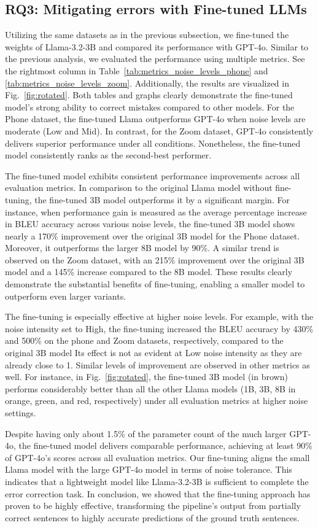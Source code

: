 \subsection{RQ3: Mitigating errors with Fine-tuned LLMs}
\label{sec:ft_results}
Utilizing the same datasets as in the previous subsection, we fine-tuned the weights of Llama-3.2-3B and compared its performance with GPT-4o.
Similar to the previous analysis, we evaluated the performance using multiple metrics. See the rightmost column in Table~\ref{tab:metrics_noise_levels_phone} and \ref{tab:metrics_noise_levels_zoom}. Additionally, the results are visualized in Fig.~\ref{fig:rotated}. 
Both tables and graphs clearly demonstrate the fine-tuned model's strong ability to correct mistakes compared to other models. For the Phone dataset, the fine-tuned Llama outperforms GPT-4o when noise levels are moderate (Low and Mid). In contrast, for the Zoom dataset, GPT-4o consistently delivers superior performance under all conditions. Nonetheless, the fine-tuned model consistently ranks as the second-best performer.
\par
The fine-tuned model exhibits consistent performance improvements across all evaluation metrics. In comparison to the original Llama model without fine-tuning, the fine-tuned 3B model outperforms it by a significant margin. For instance, when performance gain is measured as the average percentage increase in BLEU accuracy across various noise levels, the fine-tuned 3B model shows nearly a 170\% improvement over the original 3B model for the Phone dataset. Moreover, it outperforms the larger 8B model by 90\%. A similar trend is observed on the Zoom dataset, with an 215\% improvement over the original 3B model and a 145\% increase compared to the 8B model. These results clearly demonstrate the substantial benefits of fine-tuning, enabling a smaller model to outperform even larger variants.
\par
The fine-tuning is especially effective at higher noise levels. For example, with the noise intensity set to High, the fine-tuning increased the BLEU accuracy by 430\% and 500\% on the phone and Zoom datasets, respectively, compared to the original 3B model 
Its effect is not as evident at Low noise intensity as they are already close to 1. 
Similar levels of improvement are observed in other metrics as well. 
For instance, in Fig.~\ref{fig:rotated}, the fine-tuned 3B model (in brown) performs considerably better than all the other Llama models (1B, 3B, 8B in orange, green, and red, respectively) under all evaluation metrics at higher noise settings. 
\par
Despite having only about 1.5\% of the parameter count of the much larger GPT-4o, the fine-tuned model delivers comparable performance, achieving at least 90\% of GPT-4o’s scores across all evaluation metrics.
Our fine-tuning aligns the small Llama model with the large GPT-4o model in terms of noise tolerance.
This indicates that a lightweight model like Llama-3.2-3B is sufficient to complete the error correction task.
In conclusion, we showed that the fine-tuning approach has proven to be highly effective, transforming the pipeline’s output from partially correct sentences to highly accurate predictions of the ground truth sentences.
\par

